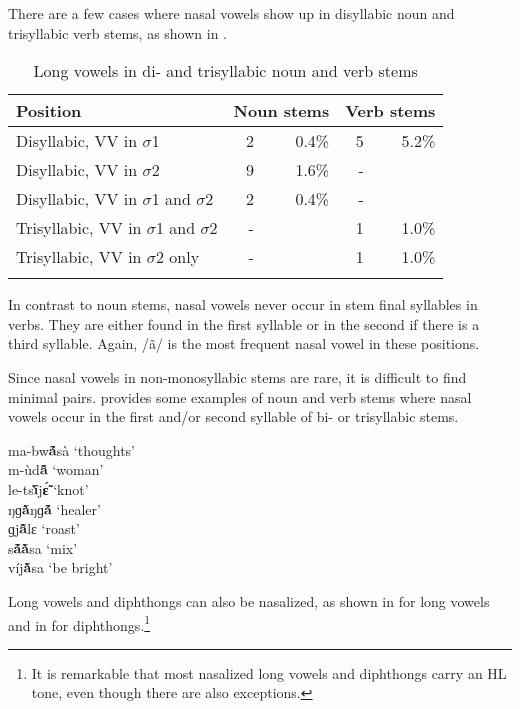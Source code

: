 There are a few cases where nasal vowels show up in disyllabic noun and trisyllabic verb stems, as shown in .

\begin{table}
\begin{tabularx}{\textwidth}{X rrrr}
\lsptoprule
Position& \multicolumn{2}{c}{Noun stems  } & \multicolumn{2}{c}{Verb stems } \\
\midrule
Disyllabic, VV in $\sigma$1 & 2 & 0.4\% & 5 & 5.2\% \\
Disyllabic, VV in $\sigma$2 & 9 & 1.6\% & - \\
Disyllabic, VV in $\sigma$1 and $\sigma$2 & 2 & 0.4\% & - \\
Trisyllabic, VV in $\sigma$1 and $\sigma$2 & - & & 1 & 1.0\% \\
Trisyllabic, VV in $\sigma$2 only & - & & 1 & 1.0\% \\
\lspbottomrule
\end{tabularx}
\caption{Long vowels in di- and trisyllabic noun and verb stems}
\label{Tab:VNasal2}
\end{table}

In contrast to noun stems, nasal vowels never occur in stem final syllables in verbs. They are either found in the first syllable or in the second if there is a third syllable. Again, /ã/ is the most frequent nasal vowel  in these positions.

Since nasal vowels in non-monosyllabic stems are rare, it is difficult to find minimal pairs.  provides some examples of noun and verb stems where nasal vowels occur in the first and/or second syllable of bi- or trisyllabic stems.

\ea \label{NasalV2}
ma-bw{\bfseries ã́}sà `thoughts' \\
 m-ùd{\bfseries ã̂} `woman' \\
le-ts{\bfseries ĩ̀}j{\bfseries ɛ̃́} `knot' \\
ŋɡ{\bfseries ã̀}ŋɡ{\bfseries ã́} `healer' \\
ɡj{\bfseries ã̂}lɛ `roast' \\
s{\bfseries ã́ã̀}sa `mix' \\
víj{\bfseries ã̀}sa `be bright'
\z

\noindent Long vowels and diphthongs can also be nasalized, as shown in  for long vowels and in  for diphthongs.\footnote{It is remarkable that most nasalized long vowels and diphthongs carry an HL tone, even though there are also exceptions.}

